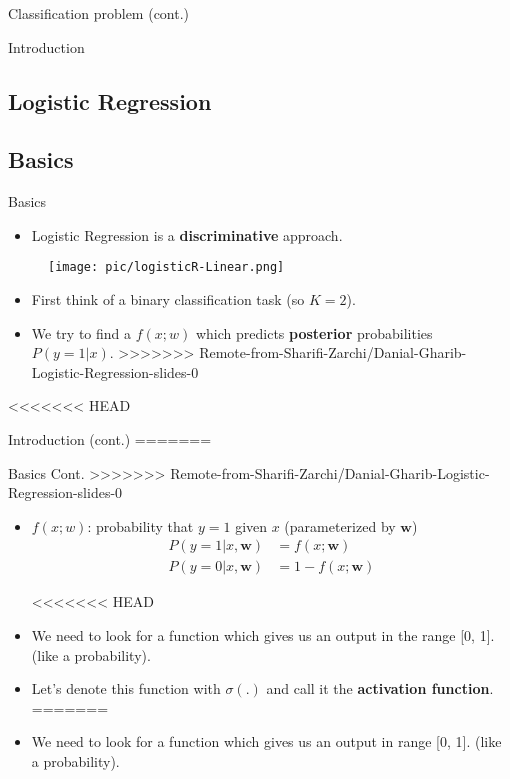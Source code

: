 \documentclass[serif, aspectratio=169]{beamer}
\begin{document}
\begin{frame}{Classification problem (cont.)}
\begin{itemize}
\begin{frame}{Introduction}
\begin{itemize}
\section{Logistic Regression}

\subsection{Basics}


\begin{frame}{Basics}
    \begin{itemize}
        \item Logistic Regression is a \textbf{discriminative} approach.
    \end{itemize}
    \begin{figure}[h]
      \centering
      \texttt{[image: pic/logisticR-Linear.png]}
    \end{figure}
    \begin{itemize}
        \item First think of a binary classification task (so $K=2$).
        \item We try to find a $f(x;w)$ which predicts \textbf{posterior} probabilities $P(y=1|x)$.
>>>>>>> Remote-from-Sharifi-Zarchi/Danial-Gharib-Logistic-Regression-slides-0
    \end{itemize}
    
\end{frame}
<<<<<<< HEAD
\begin{frame}{Introduction (cont.)}
=======
\begin{frame}{Basics Cont.}
>>>>>>> Remote-from-Sharifi-Zarchi/Danial-Gharib-Logistic-Regression-slides-0
    \begin{itemize}
        \item $f(x;w)$: probability that $y=1$ given $x$ (parameterized by \textbf{$\textbf{w}$})
      \begin{align*}
        P(y=1|x,\mathbf{w}) &= f(x;\mathbf{w}) \\
        P(y=0|x,\mathbf{w}) &= 1 - f(x;\mathbf{w})
      \end{align*}

<<<<<<< HEAD
        \item We need to look for a function which gives us an output in the range [0, 1]. (like a probability).

        \item Let's denote this function with $\sigma (.)$ and call it the \textbf{activation function}.
=======
        \item We need to look for a function which gives us an output in range [0, 1]. (like a probability).


\end{itemize}
\end{frame}
\end{frame}
\end{itemize}
\end{frame}
\end{itemize}
\end{frame}
\end{document}
